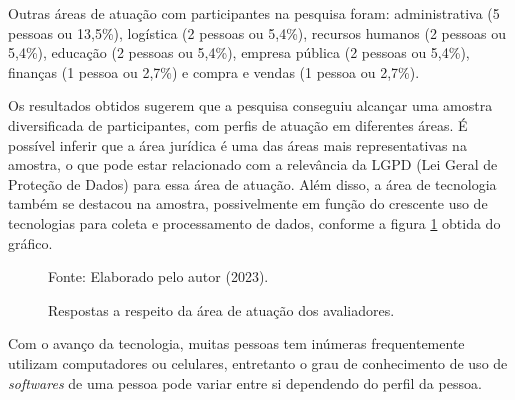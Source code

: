 \documentclass[
	12pt,				%
	openright,			%
	oneside,			%
	a4paper,			%
	english,			%
	french,				%
	spanish,			%
	brazil,				%
	]{abntex2}
\begin{document}
Outras áreas de atuação com participantes na pesquisa foram: administrativa (5 pessoas ou 13,5\%), logística (2 pessoas ou 5,4\%), recursos humanos (2 pessoas ou 5,4\%), educação (2 pessoas ou 5,4\%), empresa pública (2 pessoas ou 5,4\%), finanças (1 pessoa ou 2,7\%) e compra e vendas (1 pessoa ou 2,7\%).

Os resultados obtidos sugerem que a pesquisa conseguiu alcançar uma amostra diversificada de participantes, com perfis de atuação em diferentes áreas. É possível inferir que a área jurídica é uma das áreas mais representativas na amostra, o que pode estar relacionado com a relevância da LGPD (Lei Geral de Proteção de Dados) para essa área de atuação. Além disso, a área de tecnologia também se destacou na amostra, possivelmente em função do crescente uso de tecnologias para coleta e processamento de dados, conforme a figura \ref{fig: grafico3} obtida do gráfico.

\begin{figure}[ht]
    \centering
    \caption{Respostas a respeito da área de atuação dos avaliadores.}
    \label{fig: grafico3}
    
    \centering \small Fonte: Elaborado pelo autor (2023).
\end{figure}


Com o avanço da tecnologia, muitas pessoas tem inúmeras frequentemente utilizam computadores ou celulares, entretanto o grau de conhecimento de uso de \textit{softwares} de uma pessoa pode variar entre si dependendo do perfil da pessoa. 
\end{document}
